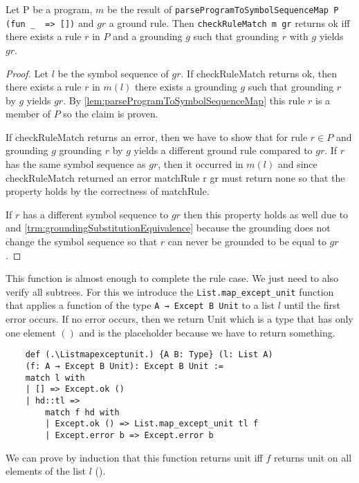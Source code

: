 \begin{lemma}[\checkRuleMatchOkIffExistsRuleForGroundRule]
    Let P be a program, $m$ be the result of \lstinline|parseProgramToSymbolSequenceMap P (fun _  => [])| and $gr$ a ground rule. Then \lstinline|checkRuleMatch m gr| returns ok iff there exists a rule $r$ in $P$ and a grounding $g$ such that grounding $r$ with $g$ yields $gr$.
\end{lemma}
\begin{proof}
    Let $l$ be the symbol sequence of $gr$. If checkRuleMatch returns ok, then there exists a rule $r$ in $m(l)$ there exists a grounding $g$ such that grounding $r$ by $g$ yields $gr$. By \cref{lem:parseProgramToSymbolSequenceMap} this rule $r$ is a member of $P$ so the claim is proven.

    If checkRuleMatch returns an error, then we have to show that for rule $r \in P$ and grounding $g$ grounding $r$ by $g$ yields a different ground rule compared to $gr$. If $r$ has the same symbol sequence as $gr$, then it occurred in $m(l)$ and since checkRuleMatch returned an error matchRule r gr must return none so that the property holds by the correctness of matchRule.

    If $r$ has a different symbol sequence to $gr$ then this property holds as well due to \symbolSequenceNotEq and \cref{trm:groundingSubstitutionEquivalence} because the grounding does not change the symbol sequence so that $r$ can never be grounded to be equal to $gr$.
\end{proof}

This function is almost enough to complete the rule case. We just need to also verify all subtrees. For this we introduce the \lstinline|List.map_except_unit| function that applies a function of the type \lstinline|A → Except B Unit| to a list $l$ until the first error occurs. If no error occurs, then we return Unit which is a type that has only one element $()$ and is the placeholder because we have to return something.

\begin{lstlisting}
    def (.\Listmapexceptunit.) {A B: Type} (l: List A) 
    (f: A → Except B Unit): Except B Unit :=
    match l with
    | [] => Except.ok ()
    | hd::tl =>
        match f hd with
        | Except.ok () => List.map_except_unit tl f
        | Except.error b => Except.error b
\end{lstlisting}

We can prove by induction that this function returns unit iff $f$ returns unit on all elements of the list $l$ (\ListmapexceptunitIsUnitIffAll).

